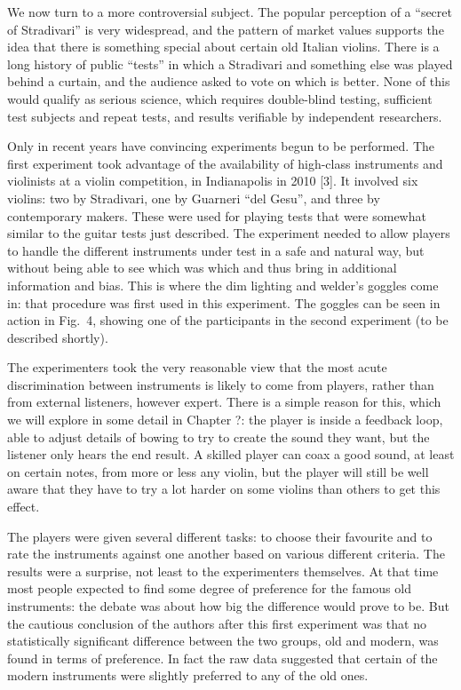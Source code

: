   We now turn to a more controversial subject. The popular perception of a 
  “secret of Stradivari” is very widespread, and the pattern of market values 
  supports the idea that there is something special about certain old Italian 
  violins. There is a long history of public “tests” in which a Stradivari and 
  something else was played behind a curtain, and the audience asked to vote on 
  which is better. None of this would qualify as serious science, which 
  requires double-blind testing, sufficient test subjects and repeat tests, and 
  results verifiable by independent researchers. 

  Only in recent years have convincing experiments begun to be performed. The 
  first experiment took advantage of the availability of high-class instruments 
  and violinists at a violin competition, in Indianapolis in 2010 [3]. It 
  involved six violins: two by Stradivari, one by Guarneri “del Gesu”, and 
  three by contemporary makers. These were used for playing tests that were 
  somewhat similar to the guitar tests just described. The experiment needed to 
  allow players to handle the different instruments under test in a safe and 
  natural way, but without being able to see which was which and thus bring in 
  additional information and bias. This is where the dim lighting and welder’s 
  goggles come in: that procedure was first used in this experiment. The 
  goggles can be seen in action in Fig.\ 4, showing one of the participants in 
  the second experiment (to be described shortly). 


  The experimenters took the very reasonable view that the most acute 
  discrimination between instruments is likely to come from players, rather 
  than from external listeners, however expert. There is a simple reason for 
  this, which we will explore in some detail in Chapter ?: the player is inside 
  a feedback loop, able to adjust details of bowing to try to create the sound 
  they want, but the listener only hears the end result. A skilled player can 
  coax a good sound, at least on certain notes, from more or less any violin, 
  but the player will still be well aware that they have to try a lot harder on 
  some violins than others to get this effect. 

  The players were given several different tasks: to choose their favourite and 
  to rate the instruments against one another based on various different 
  criteria. The results were a surprise, not least to the experimenters 
  themselves. At that time most people expected to find some degree of 
  preference for the famous old instruments: the debate was about how big the 
  difference would prove to be. But the cautious conclusion of the authors 
  after this first experiment was that no statistically significant difference 
  between the two groups, old and modern, was found in terms of preference. In 
  fact the raw data suggested that certain of the modern instruments were 
  slightly preferred to any of the old ones. 

